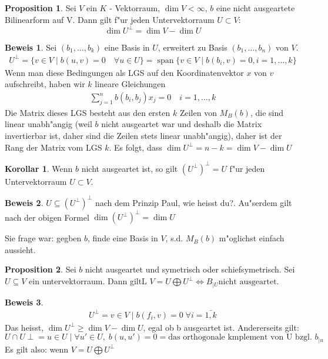 \documentclass[oneside,fontsize=11pt,paper=a4,BCOR=0mm,DIV=12,automark,headsepline]{scrbook}
\newcommand{\gq}[1]{\glqq{}#1\grqq{}} %
\DeclareMathOperator{\spn}{span}
\theoremstyle{remark}
\theoremstyle{definition}
\newtheorem*{proposition}{Proposition}
\newtheorem*{korollar}{Korollar}
\theoremstyle{definition}
\newtheorem*{prof}{Beweis}
\theoremstyle{remark}
\begin{document}
\begin{proposition}
  Sei $V$ ein $K$ - Vektorraum, \(\dim V < \infty\), $b$ eine nicht ausgeartete Bilinearform auf V.
  Dann gilt f"ur jeden Untervektorraum \(U\subset V\):
  \[\dim U^\perp = \dim V - \dim U\]
\end{proposition}
\begin{prof}
  Sei \((b_1, \dots, b_k)\) eine Basis in \(U\), erweitert zu Basis \((b_1,\dots, b_n)\) von \(V\).
  \begin{align*}
    U^\perp = \{v\in V \mid b(u, v) = 0\quad \forall u\in U\} = \spn \{v\in V\mid b(b_i, v) = 0, i=1,\dots, k\}
  \end{align*}
  Wenn man diese Bedingungen als LGS auf den Koordinatenvektor \(x\) von \(v\) aufschreibt, haben wir \(k\) lineare Gleichungen
  \begin{align*}
    \sum_{j=1}^nb(b_i, b_j)x_j = 0\quad i = 1,\dots, k
  \end{align*}
  Die Matrix dieses LGS besteht aus den ersten \(k\) Zeilen von \(M_B(b)\), die sind linear unabh"angig (weil \(b\) nicht ausgeartet war und deshalb die Matrix invertierbar ist, daher sind die Zeilen stets linear unabh"angig), daher ist der Rang der Matrix vom LGS \(k\). Es folgt, dass \(\dim U^\perp = n - k = \dim V - \dim U\)
\end{prof}
\begin{korollar}
  Wenn $b$ nicht ausgeartet ist, so gilt
  $(U^\perp)^\perp = U$ f"ur jeden Untervektorraum $U\subset V$.
\end{korollar}
\begin{prof}
  \(U\subseteq (U^\perp)^\perp\) nach dem Prinzip \gq{Paul, wie heisst du?}. Au"serdem gilt nach der obigen Formel \(\dim (U^\perp)^\perp = \dim U\)
\end{prof}

Sie frage war: gegben $b$, finde eine Basis in $V$, s.d. $M_B(b)$ m"oglichst
einfach aussieht.

\begin{proposition}
  Sei $b$ nicht ausgeartet und symetrisch oder schiefsymetrisch. Sei $U\subseteq
  V$ ein untervektorraum. Dann giltL $V=U\bigoplus U^\perp \iff B_{\mid U}
  \text{nicht ausgeartet}$.
\end{proposition}

\begin{prof}
  \begin{align*}
    U^\perp = {v\in V \mid b(f_i,v)=0\; \forall i=\bar{1,k}}
  \end{align*}
  Das heisst, $\dim U^\perp \geq \dim V - \dim U$, egal ob b ausgeartet ist.
  Andererseits gilt: \[U\cap U\perp = {u\in U \mid \forall u'\in U,\; b(u,u')=0}
  = \text{das orthogonale kmplement von U bzgl. } b_{\mid u}\]
Es gilt also: wenn $V=U \bigoplus U^\perp$
\end{prof}
\end{document}
